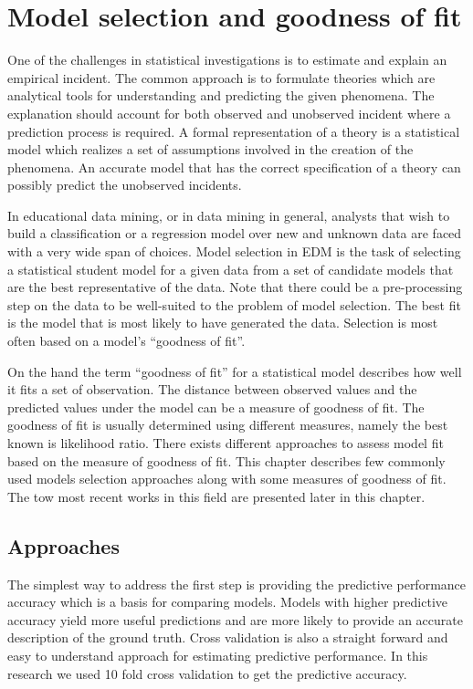 \label{sec:RelatedWorks}

\section{Model selection and goodness of fit}
One of the challenges in statistical investigations is to estimate and explain an empirical incident. The common approach is to formulate theories which are analytical tools for understanding and predicting the given phenomena. The explanation should account for both observed and unobserved incident where a prediction process is required. A formal representation of a theory is a statistical model which realizes a set of assumptions involved in the creation of the phenomena. An accurate model that has the correct specification of a theory can possibly predict the unobserved incidents.

In educational data mining, or in data mining in general, analysts that wish to build a classification or a regression model over new and unknown data are faced with a very wide span of choices. Model selection in EDM is the task of selecting a statistical student model for a given data from a set of candidate models that are the best representative of the data. Note that there could be a pre-processing step on the data to be well-suited to the problem of model selection. The best fit is the model that is most likely to have generated the data. Selection is most often based on a model's ``goodness of fit''.

On the hand the term ``goodness of fit''  for a statistical model describes how well it fits a set of observation. The distance between observed values and the predicted values under the model can be a measure of goodness of fit. The goodness of fit is usually determined using different measures, namely the best known is likelihood ratio. There exists different approaches to assess model fit based on the measure of goodness of fit. This chapter describes few commonly used models selection approaches along with some measures of goodness of fit. The tow most recent works \citep{Desmarais2010,Rosenberg2015} in this field are presented later in this chapter.

\subsection{Approaches}
The simplest way to address the first step is providing the predictive performance accuracy which is a basis for comparing models. Models with higher predictive accuracy yield more useful predictions and are more likely to provide an accurate description of the ground truth. Cross validation is also a straight forward and easy to understand approach for estimating predictive performance. In this research we used 10 fold cross validation to get the predictive accuracy.

